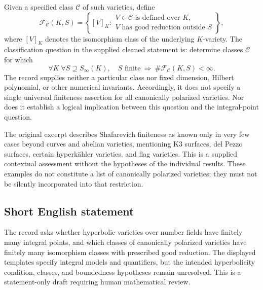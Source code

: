 \documentclass[11pt]{article}
\begin{document}
Given a specified class \(\mathscr C\) of such varieties, define
\[
\mathscr F_{\mathscr C}(K,S)=
\left\{[V]_K:\begin{array}{l}
V\in\mathscr C\text{ is defined over }K,\\
V\text{ has good reduction outside }S
\end{array}\right\},
\]
where \([V]_K\) denotes the isomorphism class of the underlying \(K\)-variety. The classification question in the supplied cleaned statement is: determine classes \(\mathscr C\) for which
\[
\forall K\;\forall S\supseteq S_\infty(K),\quad
S\text{ finite}\ \Longrightarrow\
\#\mathscr F_{\mathscr C}(K,S)<\infty.
\]
The record supplies neither a particular class nor fixed dimension, Hilbert polynomial, or other numerical invariants. Accordingly, it does not specify a single universal finiteness assertion for all canonically polarized varieties. Nor does it establish a logical implication between this question and the integral-point question.

The original excerpt describes Shafarevich finiteness as known only in very few cases beyond curves and abelian varieties, mentioning K3 surfaces, del Pezzo surfaces, certain hyperk\"ahler varieties, and flag varieties. This is a supplied contextual assessment without the hypotheses of the individual results. These examples do not constitute a list of canonically polarized varieties; they must not be silently incorporated into that restriction.
\subsection{Short English statement}
The record asks whether hyperbolic varieties over number fields have finitely many integral points, and which classes of canonically polarized varieties have finitely many isomorphism classes with prescribed good reduction. The displayed templates specify integral models and quantifiers, but the intended hyperbolicity condition, classes, and boundedness hypotheses remain unresolved. This is a statement-only draft requiring human mathematical review.
\end{document}
